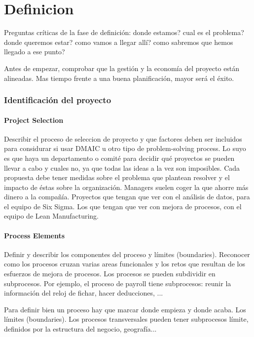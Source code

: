\documentclass[]{article}
\begin{document}
\part*{Definicion}

Preguntas críticas de la fase de definición: donde estamos? cual es el problema? donde queremos estar? como vamos a llegar allí? como sabremos que hemos llegado a ese punto?

Antes de empezar, comprobar que la gestión y la economía del proyecto están alineadas. Mas tiempo frente a una buena planificación, mayor será el éxito. 

\section{Identificación del proyecto}
\subsection{Project Selection}

Describir el proceso de seleccion de proyecto y que factores deben ser incluidos para considurar si usar DMAIC u otro tipo de problem-solving process. Lo suyo es que haya un departamento o comité para decidir qué proyectos se pueden llevar a cabo y cuales no, ya que todas las ideas a la vez son imposibles. Cada propuesta debe tener medidas sobre el problema que plantean resolver y el impacto de éstas sobre la organización. Managers suelen coger la que ahorre más dinero a la compañía.
Proyectos que tengan que ver con el análisis de datos, para el equipo de Six Sigma. Los que tengan que ver con mejora de procesos, con el equipo de Lean Manufacturing.

\subsection{Process Elements}

Definir y describir los componentes del proceso	y límites (boundaries). Reconocer como los procesos cruzan varias areas funcionales y los retos que resultan de los esfuerzos de mejora de procesos. Los procesos se pueden subdividir en subprocesos.
Por ejemplo, el proceso de payroll tiene subprocesos: reunir la información del reloj de fichar, hacer deducciones, ...

Para definir bien un proceso hay que marcar donde empieza y donde acaba. Los límites (boundaries). Los procesos transversales pueden tener subprocesos límite, definidos por la estructura del negocio, geografía...
\end{document}
